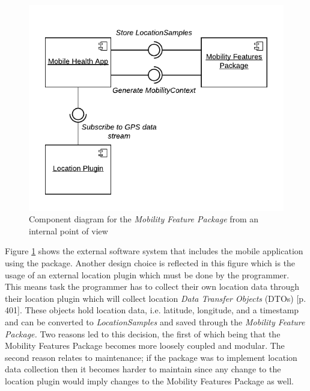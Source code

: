 \begin{figure}[h]
\centering
\includegraphics[width=\textwidth]{images/diagrams/component-external.pdf}
\caption{Component diagram for the \textit{Mobility Feature Package} from an internal point of view}
\label{fig:component-diagram-external}
\end{figure}

Figure \ref{fig:component-diagram-external} shows the external software system that includes the mobile application using the package. Another design choice is reflected in this figure which is the usage of an external location plugin which must be done by the programmer. This means task the programmer has to collect their own location data through their location plugin which will collect location \textit{Data Transfer Objects} (DTOs) \cite{fowler-PEEA} [p. 401]. These objects hold location data, i.e. latitude, longitude, and a timestamp and can be converted to \textit{LocationSamples} and saved through the \textit{Mobility Feature Package.}
Two reasons led to this decision, the first of which being that the Mobility Features Package becomes more loosely coupled and modular. The second reason relates to maintenance; if the package was to implement location data collection then it becomes harder to maintain since any change to the location plugin would imply changes to the Mobility Features Package as well. 

